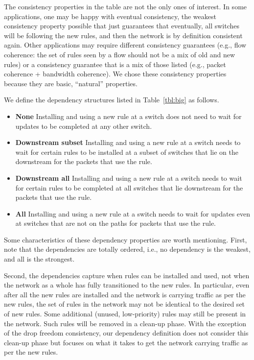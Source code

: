 The consistency properties in the table are not the only ones of interest. In some applications, one may be happy with eventual consistency, the weakest consistency property possible that just guarantees that eventually, all switches will be following the new rules, and then the network is by definition consistent again. Other applications may require different consistency guarantees (e.g., flow coherence: the set of rules seen by a flow should not be a mix of old and new rules) or a consistency guarantee that is a mix of those listed (e.g., packet coherence + bandwidth coherence). We chose these consistency properties because they are basic, ``natural'' properties.

We define the dependency structures listed in Table~\ref{tbl:big} as follows.

\begin{itemize}

\item
\textbf{None} Installing and using a new rule at a switch does not need to wait for updates to be completed at any other switch.

\item
\textbf{Downstream subset} Installing and using a new rule at a switch needs to wait for certain rules to be installed at a subset of switches that lie on the downstream for the packets that use the rule.

\item
\textbf{Downstream all} Installing and using a new rule at a switch needs to wait for certain rules to be completed at all switches that lie downstream for the packets that use the rule.

\item
\textbf{All} Installing and using a new rule at a switch needs to wait for updates even at switches that are not on the paths for packets that use the rule.

\end{itemize}

Some characteristics of these dependency properties are worth mentioning. First, note that the dependencies are totally ordered, i.e., no dependency is the weakest, and all is the strongest.

Second, the dependencies capture when rules can be installed and used, not when the network as a whole has fully transitioned to the new rules. In particular, even after all the new rules are installed and the network is carrying traffic as per the new rules, the set of rules in the network may not be identical to the desired set of new rules. Some additional (unused, low-priority) rules may still be present in the network. Such rules will be removed in a clean-up phase. With the exception of the drop freedom consistency, our dependency definition does not consider this clean-up phase but focuses on what it takes to get the network carrying traffic as per the new rules.

